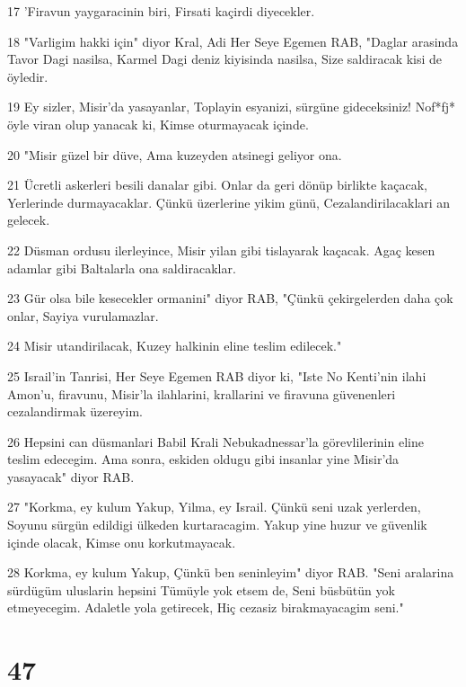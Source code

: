 \par 17 'Firavun yaygaracinin biri, Firsati kaçirdi diyecekler.
\par 18 "Varligim hakki için" diyor Kral, Adi Her Seye Egemen RAB, "Daglar arasinda Tavor Dagi nasilsa, Karmel Dagi deniz kiyisinda nasilsa, Size saldiracak kisi de öyledir.
\par 19 Ey sizler, Misir'da yasayanlar, Toplayin esyanizi, sürgüne gideceksiniz! Nof*fj* öyle viran olup yanacak ki, Kimse oturmayacak içinde.
\par 20 "Misir güzel bir düve, Ama kuzeyden atsinegi geliyor ona.
\par 21 Ücretli askerleri besili danalar gibi. Onlar da geri dönüp birlikte kaçacak, Yerlerinde durmayacaklar. Çünkü üzerlerine yikim günü, Cezalandirilacaklari an gelecek.
\par 22 Düsman ordusu ilerleyince, Misir yilan gibi tislayarak kaçacak. Agaç kesen adamlar gibi Baltalarla ona saldiracaklar.
\par 23 Gür olsa bile kesecekler ormanini" diyor RAB, "Çünkü çekirgelerden daha çok onlar, Sayiya vurulamazlar.
\par 24 Misir utandirilacak, Kuzey halkinin eline teslim edilecek."
\par 25 Israil'in Tanrisi, Her Seye Egemen RAB diyor ki, "Iste No Kenti'nin ilahi Amon'u, firavunu, Misir'la ilahlarini, krallarini ve firavuna güvenenleri cezalandirmak üzereyim.
\par 26 Hepsini can düsmanlari Babil Krali Nebukadnessar'la görevlilerinin eline teslim edecegim. Ama sonra, eskiden oldugu gibi insanlar yine Misir'da yasayacak" diyor RAB.
\par 27 "Korkma, ey kulum Yakup, Yilma, ey Israil. Çünkü seni uzak yerlerden, Soyunu sürgün edildigi ülkeden kurtaracagim. Yakup yine huzur ve güvenlik içinde olacak, Kimse onu korkutmayacak.
\par 28 Korkma, ey kulum Yakup, Çünkü ben seninleyim" diyor RAB. "Seni aralarina sürdügüm uluslarin hepsini Tümüyle yok etsem de, Seni büsbütün yok etmeyecegim. Adaletle yola getirecek, Hiç cezasiz birakmayacagim seni."

\chapter{47}

